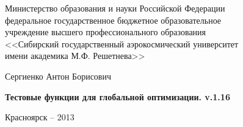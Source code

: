 \thispagestyle{empty}

\begin{center}
Министерство образования и науки Российской Федерации \\ федеральное государственное бюджетное образовательное \\ учреждение высшего профессионального образования \\<<Сибирский государственный аэрокосмический университет \\ имени академика М.Ф. Решетнева>>
\end{center}

\vspace{20mm}


\vspace{30mm}
\begin{center}
{\large Сергиенко Антон Борисович}
\end{center}

\vspace{5mm}
\begin{center}
{\bf \large Тестовые функции для глобальной оптимизации. v.1.16
\par}

\vspace{10mm}


\vspace{10mm}

\end{center}

\vspace{80mm}


\vspace{20mm}
\begin{center}
{Красноярск -- 2013}
\end{center}

\newpage